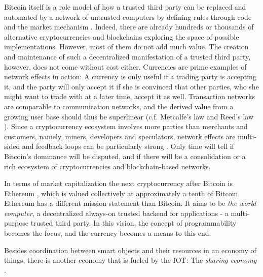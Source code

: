 Bitcoin itself is a role model of how a trusted third party can be replaced and automated by a network of untrusted computers by defining rules through code and the market mechanism \parencite{lessig2009code}. Indeed, there are already hundreds or thousands of alternative cryptocurrencies and blockchains exploring the space of possible implementations. However, most of them do not add much value. The creation and maintenance of such a decentralized manifestation of a trusted third party, however, does not come without cost either. Currencies are prime examples of network effects in action: A currency is only useful if a trading party is accepting it, and the party will only accept it if she is convinced that other parties, who she might want to trade with at a later time, accept it as well. Transaction networks are comparable to communication networks, and the derived value from a growing user base should thus be superlinear (c.f. Metcalfe's law \parencite{10.1109/MC.2013.374} and Reed's law \parencite{reed1999sneaky}). Since a cryptocurrency ecosystem involves more parties than merchants and customers, namely, miners, developers and speculators, network effects are multi-sided and feedback loops can be particularly strong \parencite{Giaglis2014}. Only time will tell if Bitcoin's dominance will be disputed, and if there will be a consolidation or a rich ecosystem of cryptocurrencies and blockchain-based networks.

In terms of  market capitalization the next cryptocurrency after Bitcoin is Ethereum \parencite{ethereumWhite}, which is valued collectively at approximately a tenth of Bitcoin. Ethereum has a different mission statement than Bitcoin. It aims to be \emph{the world computer}, a decentralized always-on trusted backend for applications - a multi-purpose trusted third party. In this vision, the concept of programmability becomes the focus, and the currency becomes a means to this end. 

Besides coordination between smart objects and their resources in an economy of things, there is another economy that is fueled by the \ac{IOT}: The \emph{sharing economy} \parencite{sundararajan2016sharing}.

